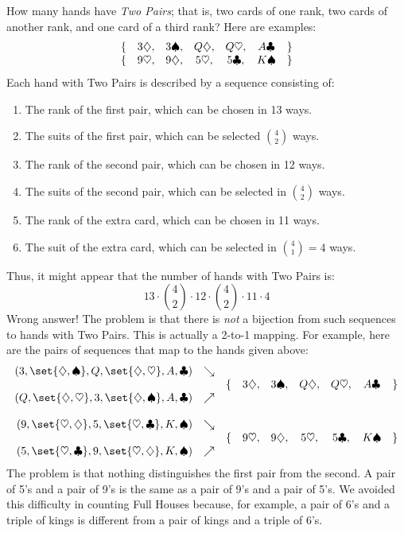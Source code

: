 How many hands have \emph{Two Pairs}; that is, two cards of one
rank, two cards of another rank, and one card of a third rank?
Here are examples:
%
\[
\begin{array}{rcccccl}
\{ & 3 \diamondsuit, & 3 \spadesuit, & Q \diamondsuit, & Q \heartsuit, & A \clubsuit & \} \\
\{ & 9 \heartsuit, & 9 \diamondsuit, & 5 \heartsuit, & 5 \clubsuit, & K \spadesuit & \}
\end{array}
\]
%
Each hand with Two Pairs is described by a sequence consisting of:
%
\begin{enumerate}
\item The rank of the first pair, which can be chosen in 13 ways.
\item The suits of the first pair, which can be selected $\binom{4}{2}$ ways.
\item The rank of the second pair, which can be chosen in 12 ways.
\item The suits of the second pair, which can be selected in $\binom{4}{2}$ ways.
\item The rank of the extra card, which can be chosen in 11 ways.
\item The suit of the extra card, which can be selected in $\binom{4}{1} = 4$ ways.
\end{enumerate}
%
Thus, it might appear that the number of hands with Two Pairs is:
%
\[
13 \cdot \binom{4}{2} \cdot 12 \cdot \binom{4}{2} \cdot 11 \cdot 4
\]
%
Wrong answer!  The problem is that there is \emph{not} a bijection
from such sequences to hands with Two Pairs.  This is actually a
2-to-1 mapping.  For example, here are the pairs of sequences that map
to the hands given above:
%
\[
\begin{array}{rcrcccccl}
(3, \set{\dia, \spa}, Q, \set{\dia, \hea}, A, \clu) & \searrow \\
 & & \{ & 3 \dia, & 3 \spa, & Q \dia, & Q \hea, & A \clu & \} \\
(Q, \set{\dia, \hea}, 3, \set{\dia, \spa}, A, \clu) & \nearrow \\
\\
(9, \set{\hea, \dia}, 5, \set{\hea, \clu}, K, \spa) & \searrow \\
& & \{ & 9 \hea, & 9 \dia, & 5 \hea, & 5 \clu, & K \spa & \} \\
(5, \set{\hea, \clu}, 9, \set{\hea, \dia}, K, \spa) & \nearrow \\
\end{array}
\]
%
The problem is that nothing distinguishes the first pair from the
second.  A pair of 5's and a pair of 9's is the same as a pair of 9's
and a pair of 5's.  We avoided this difficulty in counting Full Houses
because, for example, a pair of 6's and a triple of kings is different
from a pair of kings and a triple of 6's.

